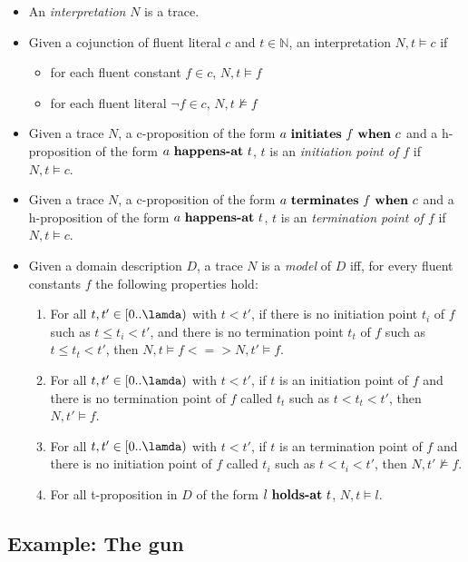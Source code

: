 \begin{itemize}
  \item An \emph{interpretation} $N$ is a trace.
  \item Given a cojunction of fluent literal $c$ and $t \in \mathbb{N}$, an interpretation $N,t \vDash c$ if
    \begin{itemize}
      \item for each fluent constant $f\in c$, $N,t \vDash f$
      \item for each fluent literal $\neg f\in c$, $N,t \nvDash f$
    \end{itemize}
  \item Given a trace $N$, a c-proposition of the form $a \text{ \textbf{initiates} } f \text{ \textbf{when} } c$ and a h-proposition of the form $a \text{ \textbf{happens-at} } t$, $t$ is an \emph{initiation point of $f$} if $N,t \vDash c$.
  \item Given a trace $N$, a c-proposition of the form $a \text{ \textbf{terminates} } f \text{ \textbf{when} } c$ and a h-proposition of the form $a \text{ \textbf{happens-at} } t$, $t$ is an \emph{termination point of $f$} if $N,t \vDash c$.
  \item Given a domain description $D$, a trace $N$ is a \emph{model} of $D$ iff, for every fluent constants $f$ the following properties hold:
  \begin{enumerate}
    \item For all $t,t'\in [0..\lamda)$ with $t<t'$, if there is no initiation point $t_i$ of $f$ such as $t \leq t_i < t'$, and there is no termination point $t_t$ of $f$ such as $t \leq t_t < t'$, then $N,t \vDash f <=> N,t' \vDash f$.
    \item For all $t,t'\in [0..\lamda)$ with $t<t'$, if $t$ is an initiation point of $f$ and there is no termination point of $f$ called $t_t$ such as $t < t_t < t'$, then $N,t' \vDash f$.
    \item For all $t,t'\in [0..\lamda)$ with $t<t'$, if $t$ is an termination point of $f$ and there is no initiation point of $f$ called $t_i$ such as $t < t_i < t'$, then $N,t' \nvDash f$.
    \item For all t-proposition in $D$ of the form $l \text{ \textbf{holds-at} } t$, $N,t \vDash l$.
  \end{enumerate}
\end{itemize}

\subsection{Example: The gun}

